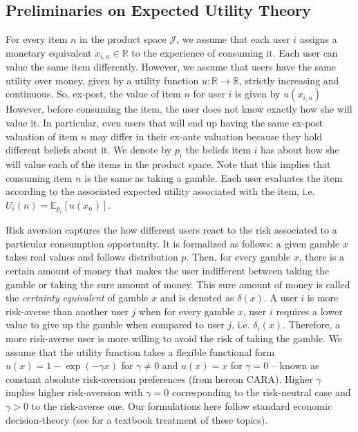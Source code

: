 \documentclass[format=acmsmall, review=false]{acmart}
\begin{document}
\subsection{Preliminaries on Expected Utility Theory}
\noindent For every item $n$ in the product space $\mathcal J$, we assume that each user $i$ assigns a monetary equivalent $x_{i,n} \in \mathbb R$ to the experience of consuming it. Each user can value the same item differently. However, we assume that users have the same utility over money, given by a utility function $u: \mathbb R \to \mathbb R$, strictly increasing and continuous. So, ex-post, the value of item $n$ for user $i$ is given by $u(x_{i,n})$ However, before consuming the item, the user does not know exactly how she will value it. In particular, even users that will end up having the same ex-post valuation of item $n$ may differ in their ex-ante valuation because they hold different beliefs about it. We denote by $p_{i}$ the beliefs item $i$ has about how she will value each of the items in the product space. Note that this implies that consuming item $n$ is the same as taking a gamble. Each user evaluates the item according to the associated expected utility associated with the item, i.e. $U_i(n)=\mathbb E_{p_i}[u(x_n)]$. 
\par

Risk aversion captures the how different users react to the risk associated to a particular consumption opportunity. It is formalized as follows: a given gamble $x$ takes real values and follows distribution $p$. Then, for every gamble $x$, there is a certain amount of money that makes the user indifferent between taking the gamble or taking the sure amount of money. This sure amount of money is called the \textit{certainty equivalent} of gamble $x$ and is denoted as $\delta(x)$. A user $i$ is more risk-averse than another user $j$ when for every gamble $x$, user $i$ requires a lower value to give up the gamble when compared to user $j$, i.e. $\delta_i(x)$. Therefore, a more risk-averse user is more willing to avoid the risk of taking the gamble. We assume that the utility function takes a flexible functional form $u(x)=1-\exp(-\gamma x)$ for $\gamma\ne0$ and $u(x)=x$ for $\gamma=0$ -- known as constant absolute risk-aversion preferences (from hereon CARA). Higher $\gamma$ implies higher risk-aversion with $\gamma=0$ corresponding to the risk-neutral case and $\gamma>0$ to the risk-averse one. Our formulations here follow standard economic decision-theory (see \cite{mas1995microeconomic} for a textbook treatment of these topics).
\par
\end{document}
